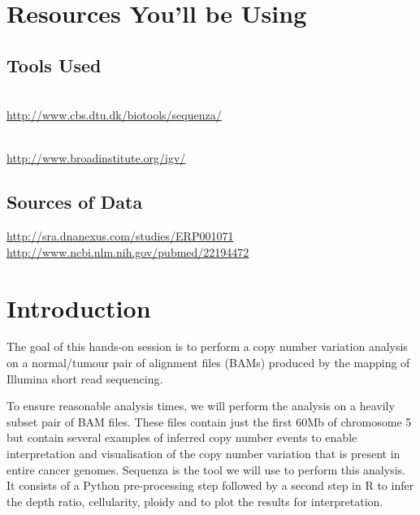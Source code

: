 \section{Resources You'll be Using}

\subsection{Tools Used}

\begin{description}[style=multiline,labelindent=0cm,align=left,leftmargin=1cm]
  \item[Sequenza] \hfill\\
    \url{http://www.cbs.dtu.dk/biotools/sequenza/}
  \item[IGV] \hfill\\
    \url{http://www.broadinstitute.org/igv/}
\end{description}


\subsection{Sources of Data}

\url{http://sra.dnanexus.com/studies/ERP001071}\\
\url{http://www.ncbi.nlm.nih.gov/pubmed/22194472}


\newpage


\section{Introduction}

The goal of this hands-on session is to perform a copy number variation analysis on a normal/tumour pair of alignment files (BAMs) produced by the mapping of Illumina short read sequencing. 

To ensure reasonable analysis times, we will perform the analysis on a heavily subset pair of BAM files. These files contain just the first 60Mb of chromosome 5 but contain several examples of inferred copy number events to enable interpretation and visualisation of the copy number variation that is present in entire cancer genomes. Sequenza is the tool we will use to perform this analysis. It consists of a Python pre-processing step followed by a second step in R to infer the depth ratio, cellularity, ploidy and to plot the results for interpretation.

